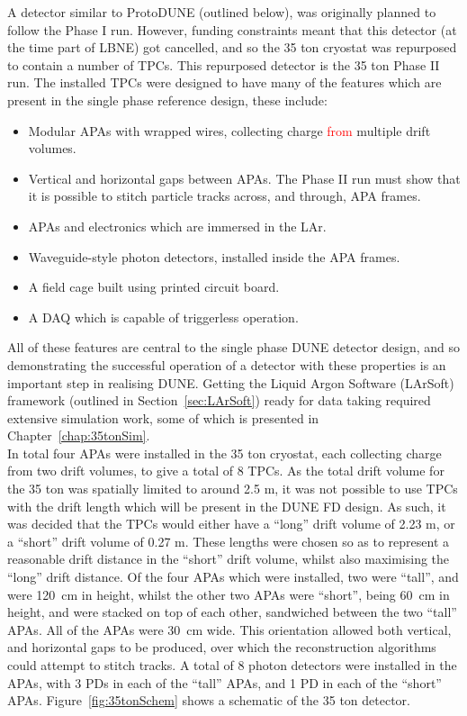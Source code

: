 A detector similar to ProtoDUNE (outlined below), was originally planned to follow the Phase I run. However, funding constraints meant that this detector (at the time part of LBNE) got cancelled, and so the 35 ton cryostat was repurposed to contain a number of TPCs. This repurposed detector is the 35 ton Phase II run. The installed TPCs were designed to have many of the features which are present in the single phase reference design, these include:
\begin{itemize}
\item Modular APAs with wrapped wires, collecting charge \textcolor{red}{from} multiple drift volumes.
\item Vertical and horizontal gaps between APAs. The Phase II run must show that it is possible to stitch particle tracks across, and through, APA frames.
\item APAs and electronics which are immersed in the LAr.
\item Waveguide-style photon detectors, installed inside the APA frames.
\item A field cage built using printed circuit board.
\item A DAQ which is capable of triggerless operation.
\end{itemize}
All of these features are central to the single phase DUNE detector design, and so demonstrating the successful operation of a detector with these properties is an important step in realising DUNE. Getting the Liquid Argon Software (LArSoft) framework (outlined in Section~\ref{sec:LArSoft}) ready for data taking required extensive simulation work, some of which is presented in Chapter~\ref{chap:35tonSim}. \\

In total four APAs were installed in the 35 ton cryostat, each collecting charge from two drift volumes, to give a total of 8 TPCs. As the total drift volume for the 35 ton was spatially limited to around 2.5 m, it was not possible to use TPCs with the drift length which will be present in the DUNE FD design. As such, it was decided that the TPCs would either have a ``long'' drift volume of 2.23 m, or a ``short'' drift volume of 0.27 m. These lengths were chosen so as to represent a reasonable drift distance in the ``short'' drift volume, whilst also maximising the ``long'' drift distance. Of the four APAs which were installed, two were ``tall'', and were 120~cm in height, whilst the other two APAs were ``short'', being 60~cm in height, and were stacked on top of each other, sandwiched between the two ``tall'' APAs. All of the APAs were 30~cm wide. This orientation allowed both vertical, and horizontal gaps to be produced, over which the reconstruction algorithms could attempt to stitch tracks. A total of 8 photon detectors were installed in the APAs, with 3 PDs in each of the ``tall'' APAs, and 1 PD in each of the ``short'' APAs. Figure~\ref{fig:35tonSchem} shows a schematic of the 35 ton detector. \\

